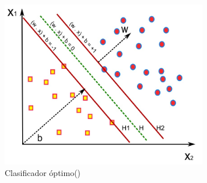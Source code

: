  \begin{figure}[H]
	\begin{center}
		\includegraphics[width=0.8\textwidth]{2/figures/svm2.jpeg}
		\caption{Clasificador óptimo(\cite{tecnica3})}
	\end{center}
\end{figure}

